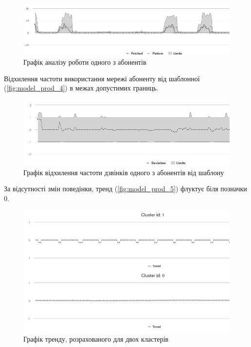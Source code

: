 \begin{figure}[h!]
        \begin{center}
            \includegraphics[scale=0.55]{resources/model_2_3.png}
        \end{center}
        \caption{Графік аналізу роботи одного з абонентів}
        \label{fig:model_prod_3}
\end{figure}

Відхилення частоти використання мережі абоненту від шаблонної (\autoref{fig:model_prod_4}) в межах допустимих границь.

\begin{figure}[h!]
        \begin{center}
            \includegraphics[scale=0.55]{resources/model_2_4.png}
        \end{center}
        \caption{Графік відхилення частоти дзвінків одного з абонентів від шаблону}
        \label{fig:model_prod_4}
\end{figure}

За відсутності змін поведінки, тренд (\autoref{fig:model_prod_5}) флуктує біля позначки 0.

\begin{figure}[h!]
        \begin{center}
            \includegraphics[scale=0.55]{resources/model_2_5.png}
        \end{center}
        \caption{Графік тренду, розрахованого для двох кластерів}
        \label{fig:model_prod_5}
\end{figure}

